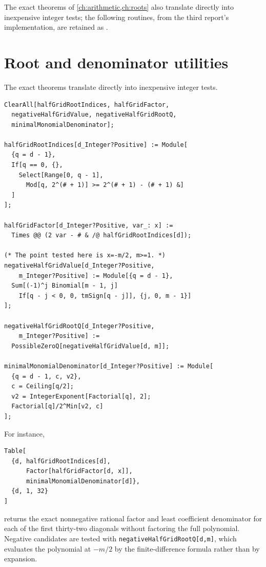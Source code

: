 \documentclass[11pt,a4paper,oneside,openany]{book}
\numberwithin{equation}{chapter}
\theoremstyle{definition}
\theoremstyle{remark}
\begin{document}
The exact theorems of \cref{ch:arithmetic,ch:roots} also translate directly
into inexpensive integer tests; the following routines, from the third
report's implementation, are retained as
.

\section{Root and denominator utilities}

The exact theorems translate directly into inexpensive integer tests.

\begin{lstlisting}[language=Wolfram,caption={Exact rational-root tests and coefficient denominator.}]
ClearAll[halfGridRootIndices, halfGridFactor,
  negativeHalfGridValue, negativeHalfGridRootQ,
  minimalMonomialDenominator];

halfGridRootIndices[d_Integer?Positive] := Module[
  {q = d - 1},
  If[q == 0, {},
    Select[Range[0, q - 1],
      Mod[q, 2^(# + 1)] >= 2^(# + 1) - (# + 1) &]
  ]
];

halfGridFactor[d_Integer?Positive, var_: x] :=
  Times @@ (2 var - # & /@ halfGridRootIndices[d]);

(* The point tested here is x=-m/2, m>=1. *)
negativeHalfGridValue[d_Integer?Positive,
    m_Integer?Positive] := Module[{q = d - 1},
  Sum[(-1)^j Binomial[m - 1, j]
    If[q - j < 0, 0, tmSign[q - j]], {j, 0, m - 1}]
];

negativeHalfGridRootQ[d_Integer?Positive,
    m_Integer?Positive] :=
  PossibleZeroQ[negativeHalfGridValue[d, m]];

minimalMonomialDenominator[d_Integer?Positive] := Module[
  {q = d - 1, c, v2},
  c = Ceiling[q/2];
  v2 = IntegerExponent[Factorial[q], 2];
  Factorial[q]/2^Min[v2, c]
];
\end{lstlisting}

For instance,
\begin{lstlisting}[language=Wolfram]
Table[
  {d, halfGridRootIndices[d],
      Factor[halfGridFactor[d, x]],
      minimalMonomialDenominator[d]},
  {d, 1, 32}
]
\end{lstlisting}
returns the exact nonnegative rational factor and least coefficient
denominator for each of the first thirty-two diagonals without factoring the
full polynomial.  Negative candidates are tested with
\texttt{negativeHalfGridRootQ[d,m]}, which evaluates the polynomial at
\(-m/2\) by the finite-difference formula rather than by expansion.
\end{document}
